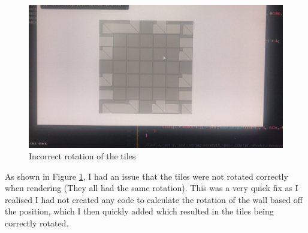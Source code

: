 \documentclass[../Main.tex]{subfiles}
\begin{document}
            \clearpage
            \begin{figure}[hbt!]
                \centerline{\includegraphics[scale=0.1]{img/Testing/General/Incorrect rotation.jpg}}
                \caption{Incorrect rotation of the tiles}
                \label{fig:IncorrectRotation}
            \end{figure}
            As shown in Figure \ref{fig:IncorrectRotation}, I had an issue that the tiles were not rotated correctly when rendering (They all had the same rotation). This was a very quick fix as I realised I had not created any code to calculate the rotation of the wall based off the position, which I then quickly added which resulted in the tiles being correctly rotated.
\end{document}
